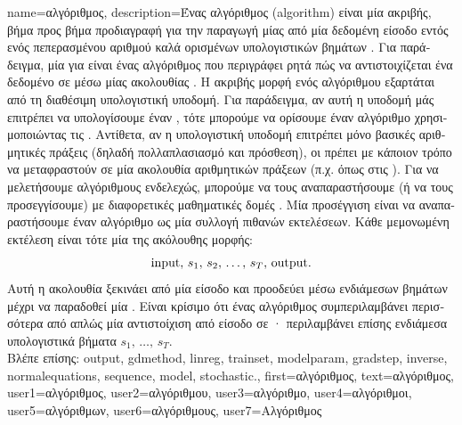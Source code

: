 {name={\foreignlanguage{greek}{αλγόριθμος}},
 	description={\foreignlanguage{greek}{Ένας} 
		\foreignlanguage{greek}{αλγόριθμος} (algorithm) \foreignlanguage{greek}{είναι μία ακριβής, βήμα προς βήμα προδιαγραφή για την  
		παραγωγή μίας}  \foreignlanguage{greek}{από μία δεδομένη είσοδο εντός ενός πεπερασμένου αριθμού 
		καλά ορισμένων υπολογιστικών βημάτων} \cite{Cormen:2022aa}. \foreignlanguage{greek}{Για παράδειγμα, μία}  
		\foreignlanguage{greek}{για}  \foreignlanguage{greek}{είναι ένας αλγόριθμος που περιγράφει ρητά πώς να 
		αντιστοιχίζεται ένα δεδομένο}  \foreignlanguage{greek}{σε}  
		\foreignlanguage{greek}{μέσω μίας ακολουθίας} . \foreignlanguage{greek}{Η ακριβής μορφή ενός αλγόριθμου 
		εξαρτάται από τη διαθέσιμη υπολογιστική υποδομή. Για παράδειγμα, αν αυτή η υποδομή μάς επιτρέπει να υπολογίσουμε 
		έναν} , \foreignlanguage{greek}{τότε μπορούμε να ορίσουμε έναν αλγόριθμο}  
		\foreignlanguage{greek}{χρησιμοποιώντας τις} . \foreignlanguage{greek}{Αντίθετα, αν η 
		υπολογιστική υποδομή επιτρέπει μόνο βασικές αριθμητικές πράξεις (δηλαδή πολλαπλασιασμό και πρόσθεση), οι}
		 \foreignlanguage{greek}{πρέπει με κάποιον τρόπο να μεταφραστούν σε μία ακολουθία αριθμητικών 
		πράξεων (π.χ. όπως στις} ). \foreignlanguage{greek}{Για να μελετήσουμε αλγόριθμους ενδελεχώς, μπορούμε 
		να τους αναπαραστήσουμε (ή να τους προσεγγίσουμε) με διαφορετικές μαθηματικές δομές} \cite{Sipser2013}. 
		\foreignlanguage{greek}{Μία προσέγγιση είναι να αναπαραστήσουμε έναν αλγόριθμο ως μία συλλογή πιθανών εκτελέσεων. Κάθε 
		μεμονωμένη εκτέλεση είναι τότε μία}  \foreignlanguage{greek}{της ακόλουθης μορφής}:
		$${\rm input}, \,s_1, \,s_2, \,\ldots, \,s_T, \,{\rm output}.$$  
		\foreignlanguage{greek}{Αυτή η ακολουθία ξεκινάει από μία είσοδο και προοδεύει μέσω ενδιάμεσων βημάτων μέχρι να παραδοθεί μία} 
		. \foreignlanguage{greek}{Είναι κρίσιμο ότι ένας αλγόριθμος συμπεριλαμβάνει περισσότερα από απλώς μία 
		αντιστοίχιση από είσοδο σε} · \foreignlanguage{greek}{περιλαμβάνει επίσης ενδιάμεσα υπολογιστικά βήματα} 
		$s_1, \,\ldots, \,s_T$.
		\\
		\foreignlanguage{greek}{Βλέπε επίσης:} \gls{output}, \gls{gdmethod}, \gls{linreg}, \gls{trainset}, \gls{modelparam}, \gls{gradstep}, \gls{inverse}, 
		\gls{normalequations}, \gls{sequence}, \gls{model}, \gls{stochastic}.},
	first={\foreignlanguage{greek}{αλγόριθμος}},
	text={\foreignlanguage{greek}{αλγόριθμος}},
	user1={\foreignlanguage{greek}{αλγόριθμος}}, %
	user2={\foreignlanguage{greek}{αλγόριθμου}}, %
	user3={\foreignlanguage{greek}{αλγόριθμο}}, %
	user4={\foreignlanguage{greek}{αλγόριθμοι}}, %
	user5={\foreignlanguage{greek}{αλγόριθμων}}, %
	user6={\foreignlanguage{greek}{αλγόριθμους}}, %
	user7={\foreignlanguage{greek}{Αλγόριθμος}} %
}

